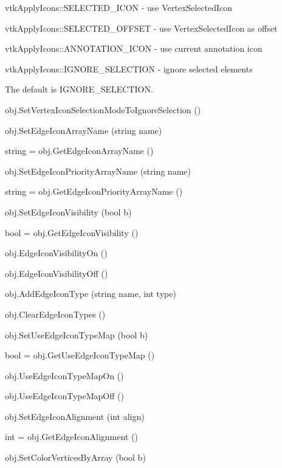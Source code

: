 \begin{DoxyItemize}
\begin{DoxyItemize}
\item vtk\-Apply\-Icons\-::\-S\-E\-L\-E\-C\-T\-E\-D\-\_\-\-I\-C\-O\-N -\/ use Vertex\-Selected\-Icon 
\item vtk\-Apply\-Icons\-::\-S\-E\-L\-E\-C\-T\-E\-D\-\_\-\-O\-F\-F\-S\-E\-T -\/ use Vertex\-Selected\-Icon as offset 
\item vtk\-Apply\-Icons\-::\-A\-N\-N\-O\-T\-A\-T\-I\-O\-N\-\_\-\-I\-C\-O\-N -\/ use current annotation icon 
\item vtk\-Apply\-Icons\-::\-I\-G\-N\-O\-R\-E\-\_\-\-S\-E\-L\-E\-C\-T\-I\-O\-N -\/ ignore selected elements 
\end{DoxyItemize}The default is I\-G\-N\-O\-R\-E\-\_\-\-S\-E\-L\-E\-C\-T\-I\-O\-N.  
\item {\ttfamily obj.\-Set\-Vertex\-Icon\-Selection\-Mode\-To\-Ignore\-Selection ()}  
\item {\ttfamily obj.\-Set\-Edge\-Icon\-Array\-Name (string name)}  
\item {\ttfamily string = obj.\-Get\-Edge\-Icon\-Array\-Name ()}  
\item {\ttfamily obj.\-Set\-Edge\-Icon\-Priority\-Array\-Name (string name)}  
\item {\ttfamily string = obj.\-Get\-Edge\-Icon\-Priority\-Array\-Name ()}  
\item {\ttfamily obj.\-Set\-Edge\-Icon\-Visibility (bool b)}  
\item {\ttfamily bool = obj.\-Get\-Edge\-Icon\-Visibility ()}  
\item {\ttfamily obj.\-Edge\-Icon\-Visibility\-On ()}  
\item {\ttfamily obj.\-Edge\-Icon\-Visibility\-Off ()}  
\item {\ttfamily obj.\-Add\-Edge\-Icon\-Type (string name, int type)}  
\item {\ttfamily obj.\-Clear\-Edge\-Icon\-Types ()}  
\item {\ttfamily obj.\-Set\-Use\-Edge\-Icon\-Type\-Map (bool b)}  
\item {\ttfamily bool = obj.\-Get\-Use\-Edge\-Icon\-Type\-Map ()}  
\item {\ttfamily obj.\-Use\-Edge\-Icon\-Type\-Map\-On ()}  
\item {\ttfamily obj.\-Use\-Edge\-Icon\-Type\-Map\-Off ()}  
\item {\ttfamily obj.\-Set\-Edge\-Icon\-Alignment (int align)}  
\item {\ttfamily int = obj.\-Get\-Edge\-Icon\-Alignment ()}  
\item {\ttfamily obj.\-Set\-Color\-Vertices\-By\-Array (bool b)}  

\end{DoxyItemize}
